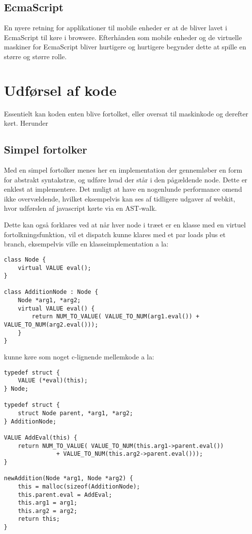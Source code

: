 \documentclass[12pt]{article}
\begin{document}
\subsection{EcmaScript}
En nyere retning for applikationer til mobile enheder er at de bliver lavet i EcmaScript til køre i browsere. Efterhånden som mobile enheder og de virtuelle maskiner for EcmaScript bliver hurtigere og hurtigere begynder dette at spille en større og større rolle.


\section{Udførsel af kode}
Essentielt kan koden enten blive fortolket, eller oversat til maskinkode og derefter kørt.
Herunder
\subsection{Simpel fortolker}
Med en simpel fortolker menes her en implementation der gennemløber en form for abstrakt syntakstræ, og udføre hvad der står i den pågældende node. 
Dette er enklest at implementere.
Det muligt at have en nogenlunde performance omend ikke overvældende, hvilket eksempelvis kan ses af tidligere udgaver af webkit, hvor udførslen af javascript kørte via en AST-walk. 

Dette kan også forklares ved at når hver node i træet er en klasse med en virtuel fortolkningsfunktion, vil et dispatch kunne klares med et par loads plus et branch, eksempelvis ville en klasseimplementation a la:
\begin{verbatim}
class Node {
    virtual VALUE eval();
}

class AdditionNode : Node {
    Node *arg1, *arg2;
    virtual VALUE eval() {
        return NUM_TO_VALUE( VALUE_TO_NUM(arg1.eval()) + VALUE_TO_NUM(arg2.eval()));
    }
}
\end{verbatim}
kunne køre som noget c-lignende mellemkode a la:
\begin{verbatim}
typedef struct {
    VALUE (*eval)(this);
} Node;

typedef struct {
    struct Node parent, *arg1, *arg2;
} AdditionNode;

VALUE AddEval(this) {
    return NUM_TO_VALUE( VALUE_TO_NUM(this.arg1->parent.eval()) 
               + VALUE_TO_NUM(this.arg2->parent.eval()));
}

newAddition(Node *arg1, Node *arg2) {
    this = malloc(sizeof(AdditionNode);
    this.parent.eval = AddEval;
    this.arg1 = arg1;
    this.arg2 = arg2;
    return this;
}
\end{verbatim}
\end{document}
